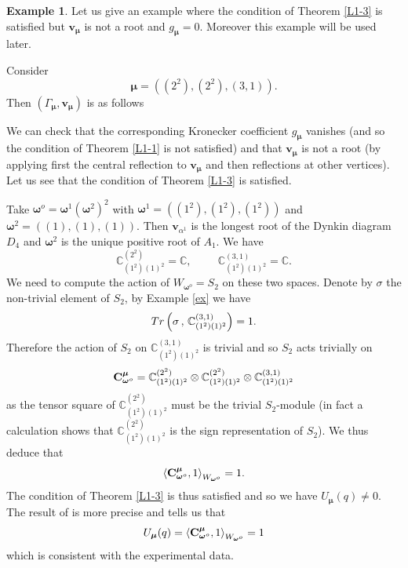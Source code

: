 \documentclass[11pt]{article}
\theoremstyle{definition}
\newtheorem{exam}[theo]{Example}
\numberwithin{equation}{section}
\newcommand{\bv}{{\mathbf{v}}}
\newcommand{\C}{{\bf C}}
\newcommand{\muhat}{{\boldsymbol \mu}}
\newcommand{\omegahat}{{\boldsymbol \omega}}
\begin{document}
\begin{exam}Let us give an example where the condition of Theorem \ref{L1-3} is satisfied but $\bv_\muhat$ is not a root and $g_\muhat= 0$. Moreover this example will be used later.
	
	Consider 
	$$
	\muhat=((2^2),(2^2),(3,1)).
	$$
	Then $(\Gamma_\muhat,\bv_\muhat)$ is as follows
	
	{\footnotesize{
			\begin{center}
	\end{center}}}
	
	
	We can check that the corresponding Kronecker coefficient $g_\muhat$ vanishes (and so the condition of Theorem \ref{L1-1} is not satisfied) and  that $\bv_\muhat$ is not a root (by applying first the central reflection to $\bv_\muhat$ and then  reflections at other vertices). Let us see that the condition of Theorem \ref{L1-3} is satisfied.
	
	Take $\omegahat^o=\omegahat^1(\omegahat^2)^2$ with $\omegahat^1=((1^2),(1^2),(1^2))$ and $\omegahat^2=((1),(1),(1))$. Then $\bv_{\alpha^1}$ is the longest root of the Dynkin diagram $D_4$ and $\omegahat^2$ is the unique positive root of $A_1$. We have
	$$
	\mathbb{C}_{(1^2)(1)^2}^{(2^2)}=\mathbb{C},\hspace{1cm}\mathbb{C}_{(1^2)(1)^2}^{(3,1)}=\mathbb{C}.
	$$
	We need to compute the action of $W_{\omegahat^o}=S_2$ on these two spaces. Denote by $\sigma$ the non-trivial element of $S_2$, by Example \ref{ex} we have
	$$
	{\rm Tr}\left(\sigma\,,\, \mathbb{C}^{(3,1)}_{(1^2)(1)^2}\right)=1.
	$$ 
	Therefore the action of $S_2$  on $\mathbb{C}_{(1^2)(1)^2}^{(3,1)}$ is trivial and so  $S_2$ acts trivially on
	$$
	\C_{\omegahat^o}^\muhat=\mathbb{C}_{(1^2)(1)^2}^{(2^2)}\otimes\mathbb{C}_{(1^2)(1)^2}^{(2^2)}\otimes\mathbb{C}_{(1^2)(1)^2}^{(3,1)}
	$$
	as the tensor square of $\mathbb{C}_{(1^2)(1)^2}^{(2^2)}$ must be the trivial $S_2$-module (in fact a calculation shows that $\mathbb{C}_{(1^2)(1)^2}^{(2^2)}$ is the sign representation of $S_2$). We thus deduce that
	$$
	\left\langle \C^\muhat_{\omegahat^o},1\right\rangle_{W_{\omegahat^o}}=1.
	$$
	The condition of Theorem \ref{L1-3} is thus satisfied and so we have  $U_\muhat(q)\neq 0$. The result of \cite{L1} is more precise and tells us that
	$$
	U_\muhat(q)=\left\langle \C^\muhat_{\omegahat^o},1\right\rangle_{W_{\omegahat^o}}=1
	$$
	which is consistent with the experimental data.
	\label{example}\end{exam}
\end{document}
